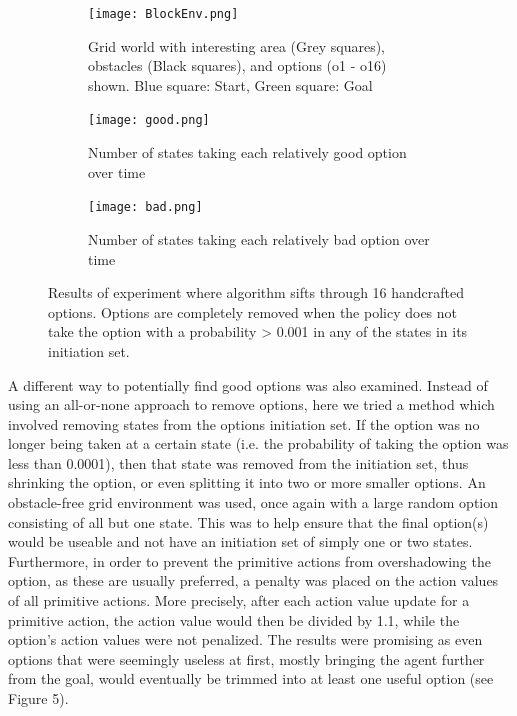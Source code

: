\documentclass{acm_proc_article-sp}
\begin{document}
\begin{figure}[!htbp]
  \begin{subfigure}[h]{.8\textwidth}
  	\centering
    \texttt{[image: BlockEnv.png]}
    \caption{Grid world with interesting area (Grey squares), obstacles (Black squares), and options (o1 - o16) shown. Blue square: Start, Green square: Goal}
  \end{subfigure}\hfill
  \begin{subfigure}[h]{.45\textwidth}
  \centering
    \texttt{[image: good.png]}
    \caption{Number of states taking each relatively good option over time}
    \end{subfigure}
  \hfill
  \begin{subfigure}[h]{.45\textwidth}
  \centering
    \texttt{[image: bad.png]}
    \caption{Number of states taking each relatively bad option over time}
  \end{subfigure}
  \caption{Results of experiment where algorithm sifts through 16 handcrafted options. Options are completely removed when the policy does not take the option with a probability > 0.001 in any of the states in its initiation set.}
  \vspace{20pt}
\end{figure}

A different way to potentially find good options was also examined. Instead of using an all-or-none approach to remove options, here we tried a method which involved removing states from the options initiation set. If the option was no longer being taken at a certain state (i.e. the probability of taking the option was less than 0.0001), then that state was removed from the initiation set, thus shrinking the option, or even splitting it into two or more smaller options. 
	An obstacle-free grid environment was used, once again with a large random option consisting of all but one state. This was to help ensure that the final option(s) would be useable and not have an initiation set of simply one or two states. Furthermore, in order to prevent the primitive actions from overshadowing the option, as these are usually preferred, a penalty was placed on the action values of all primitive actions. More precisely, after each action value update for a primitive action, the action value would then be divided by 1.1, while the option's action values were not penalized. The results were promising as even options that were seemingly useless at first, mostly bringing the agent further from the goal, would eventually be trimmed into at least one useful option (see Figure 5). 
\end{document}
